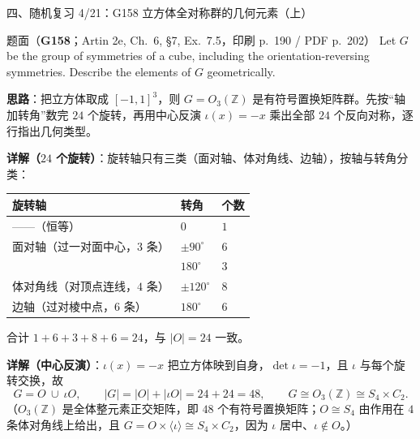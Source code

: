 \documentclass[aspectratio=169,10pt,fontset=none]{ctexbeamer}
\newcommand{\ex}[1]{\textcolor{accent}{\footnotesize\bfseries #1}}
\newcommand{\key}[1]{\textcolor{ink}{\bfseries #1}}
\begin{document}
\begin{frame}[t]{四、随机复习 4/21：G158 立方体全对称群的几何元素（上）}
\label{ex:G158}
\scriptsize
\begin{block}{\footnotesize 题面（\ex{G158}；Artin 2e, Ch.~6, §7, Ex.~7.5，印刷 p.~190 / PDF p.~202）}
Let $G$ be the group of symmetries of a cube, including the orientation-reversing symmetries. Describe the elements of $G$ geometrically.
\end{block}
\key{思路}：把立方体取成 $[-1,1]^3$，则 $G=O_3(\mathbb Z)$ 是有符号置换矩阵群。先按“轴加转角”数完 $24$ 个旋转，再用中心反演 $\iota(x)=-x$ 乘出全部 $24$ 个反向对称，逐行指出几何类型。

\key{详解（$24$ 个旋转）}：旋转轴只有三类（面对轴、体对角线、边轴），按轴与转角分类：
\begin{center}
{\scriptsize
\begin{tabular}{@{}lll@{}}
\toprule
旋转轴 & 转角 & 个数\\ \midrule
——（恒等） & $0$ & $1$\\
面对轴（过一对面中心，$3$ 条） & $\pm90^\circ$ & $6$\\
 & $180^\circ$ & $3$\\
体对角线（对顶点连线，$4$ 条） & $\pm120^\circ$ & $8$\\
边轴（过对棱中点，$6$ 条） & $180^\circ$ & $6$\\ \bottomrule
\end{tabular}}
\end{center}
合计 $1+6+3+8+6=24$，与 $|O|=24$ 一致。

\key{详解（中心反演）}：$\iota(x)=-x$ 把立方体映到自身，$\det\iota=-1$，且 $\iota$ 与每个旋转交换，故
\[ G=O\ \cup\ \iota O,\qquad |G|=|O|+|\iota O|=24+24=48,\qquad G\cong O_3(\mathbb Z)\cong S_4\times C_2. \]
（$O_3(\mathbb Z)$ 是全体整元素正交矩阵，即 $48$ 个有符号置换矩阵；$O\cong S_4$ 由作用在 $4$ 条体对角线上给出，且 $G=O\times\langle\iota\rangle\cong S_4\times C_2$，因为 $\iota$ 居中、$\iota\notin O$。）
\end{frame}
\end{document}
